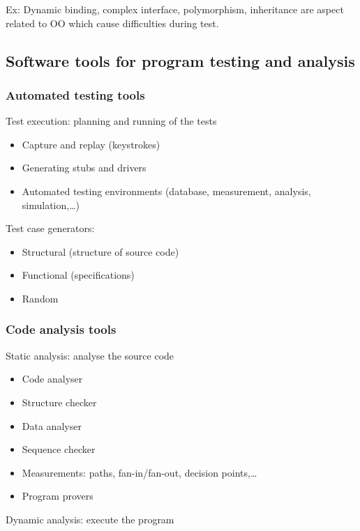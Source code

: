 Ex: Dynamic binding, complex interface, polymorphism, inheritance are aspect related to OO which cause difficulties during test.

\subsection{Software tools for program testing and analysis}

\subsubsection{Automated testing tools}

Test execution: planning and running of the tests

\begin{itemize}
    \item Capture and replay (keystrokes)
    \item Generating stubs and drivers
    \item Automated testing environments (database, measurement, analysis, simulation,\ldots)
\end{itemize}

Test case generators:

\begin{itemize}
    \item Structural (structure of source code)
    \item Functional (specifications)
    \item Random
\end{itemize}

\subsubsection{Code analysis tools}

Static analysis: analyse the source code

\begin{itemize}
    \item Code analyser
    \item Structure checker
    \item Data analyser
    \item Sequence checker
    \item Measurements: paths, fan-in/fan-out, decision points,\ldots
    \item Program provers
\end{itemize}

Dynamic analysis: execute the program

